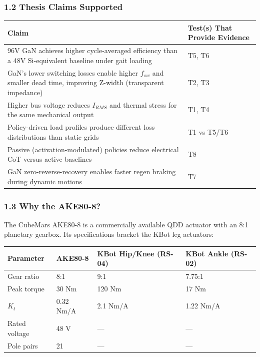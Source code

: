 \documentclass[
]{article}
\newcounter{none} %
\begin{document}
\subsubsection{1.2 Thesis Claims
Supported}\label{thesis-claims-supported}

{\def\LTcaptype{none} %
\begin{longtable}[]{@{}
  >{\raggedright\arraybackslash}p{}
  >{\raggedright\arraybackslash}p{}@{}}
\toprule\noalign{}
\begin{minipage}[b]{\linewidth}\raggedright
Claim
\end{minipage} & \begin{minipage}[b]{\linewidth}\raggedright
Test(s) That Provide Evidence
\end{minipage} \\
\midrule\noalign{}
\endhead
\bottomrule\noalign{}
\endlastfoot
96V GaN achieves higher cycle-averaged efficiency than a 48V
Si-equivalent baseline under gait loading & T5, T6 \\
GaN's lower switching losses enable higher \(f_{sw}\) and smaller dead
time, improving Z-width (transparent impedance) & T2, T3 \\
Higher bus voltage reduces \(I_{RMS}\) and thermal stress for the same
mechanical output & T1, T4 \\
Policy-driven load profiles produce different loss distributions than
static grids & T1 vs T5/T6 \\
Passive (activation-modulated) policies reduce electrical CoT versus
active baselines & T8 \\
GaN zero-reverse-recovery enables faster regen braking during dynamic
motions & T7 \\
\end{longtable}
}

\subsubsection{1.3 Why the AKE80-8?}\label{why-the-ake80-8}

The CubeMars AKE80-8 is a commercially available QDD actuator with an
8:1 planetary gearbox. Its specifications bracket the KBot leg
actuators:

{\def\LTcaptype{none} %
\begin{longtable}[]{@{}llll@{}}
\toprule\noalign{}
Parameter & AKE80-8 & KBot Hip/Knee (RS-04) & KBot Ankle (RS-02) \\
\midrule\noalign{}
\endhead
\bottomrule\noalign{}
\endlastfoot
Gear ratio & 8:1 & 9:1 & 7.75:1 \\
Peak torque & 30 Nm & 120 Nm & 17 Nm \\
\(K_t\) & 0.32 Nm/A & 2.1 Nm/A & 1.22 Nm/A \\
Rated voltage & 48 V & --- & --- \\
Pole pairs & 21 & --- & --- \\
\end{longtable}
}
\end{document}
